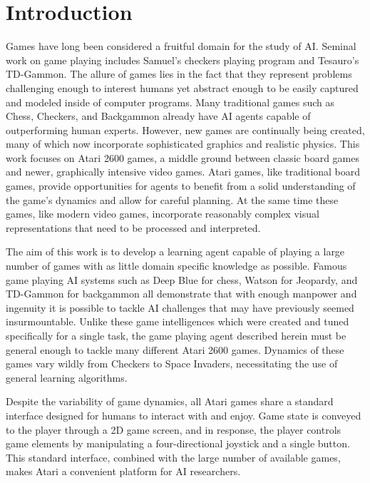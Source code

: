 \documentclass{acm_proc_article-sp}
\begin{document}


\section{Introduction}
Games have long been considered a fruitful domain for the study of AI. Seminal work on game playing includes Samuel's checkers playing program\cite{samuel_59} and Tesauro's TD-Gammon\cite{tesauro_94}. The allure of games lies in the fact that they represent problems challenging enough to interest humans yet abstract enough to be easily captured and modeled inside of computer programs. Many traditional games such as Chess, Checkers, and Backgammon already have AI agents capable of outperforming human experts. However, new games are continually being created, many of which now incorporate sophisticated graphics and realistic physics. This work focuses on Atari 2600 games, a middle ground between classic board games and newer, graphically intensive video games. Atari games, like traditional board games, provide opportunities for agents to benefit from a solid understanding of the game's dynamics and allow for careful planning. At the same time these games, like modern video games, incorporate reasonably complex visual representations that need to be processed and interpreted.

The aim of this work is to develop a learning agent capable of playing a large number of games with as little domain specific knowledge as possible. Famous game playing AI systems such as Deep Blue for chess, Watson for Jeopardy, and TD-Gammon for backgammon all demonstrate that with enough manpower and ingenuity it is possible to tackle AI challenges that may have previously seemed insurmountable. Unlike these game intelligences which were created and tuned specifically for a single task, the game playing agent described herein must be general enough to tackle many different Atari 2600 games. Dynamics of these games vary wildly from Checkers to Space Invaders, necessitating the use of general learning algorithms.

Despite the variability of game dynamics, all Atari games share a standard interface designed for humans to interact with and enjoy. Game state is conveyed to the player through a 2D game screen, and in response, the player controls game elements by manipulating a four-directional joystick and a single button. This standard interface, combined with the large number of available games, makes Atari a convenient platform for AI researchers. 
\end{document}
